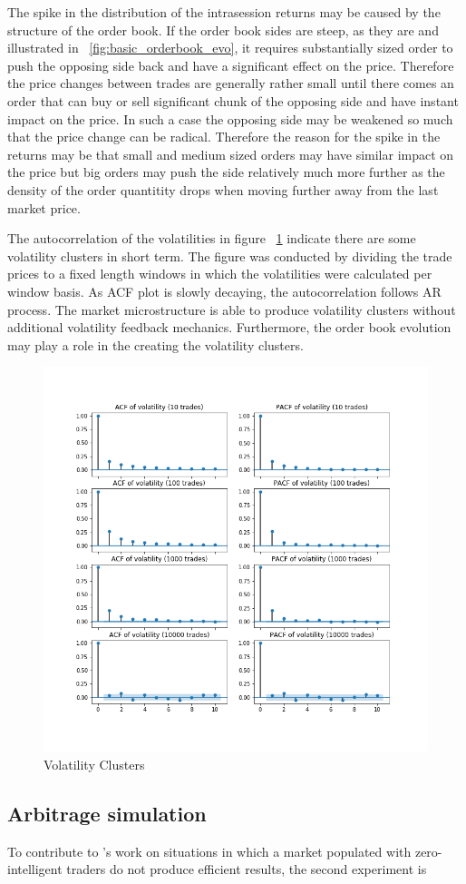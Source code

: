 The spike in the distribution of the intrasession returns may be caused by the structure of the order book. If the order book 
sides are steep, as they are and illustrated in ~\ref{fig:basic_orderbook_evo}, it requires substantially sized 
order to push the opposing side back and have a significant effect on the price. Therefore the price changes between trades 
are generally rather small until there comes an order that can buy or sell significant chunk of the opposing side and have 
instant impact on the price. In such a case the opposing side may be weakened so much that the price change can be radical. 
Therefore the reason for the spike in the returns may be that small and medium sized orders may have similar impact on the 
price but big orders may push the side relatively much more further as the density of the order quantitity drops when moving 
further away from the last market price.

The autocorrelation of the volatilities in figure ~\ref{fig:basic_volaclusters}
indicate there are some volatility clusters in short term. The figure was conducted by
dividing the trade prices to a fixed length windows in which the volatilities were calculated per
window basis. As ACF plot is slowly decaying, the autocorrelation follows AR process. The market 
microstructure is able to produce volatility clusters without additional volatility feedback mechanics.
Furthermore, the order book evolution may play a role in the creating the volatility clusters.

\begin{figure}
    \includegraphics[width=\linewidth]{plots/basic_volaclusters_intra.png}
    \caption{Volatility Clusters}
    \label{fig:basic_volaclusters}
\end{figure}

\subsection{Arbitrage simulation}

To contribute to \citet{Mil08}'s work on situations in which a market populated with zero-intelligent
traders do not produce efficient results, the second experiment is 
